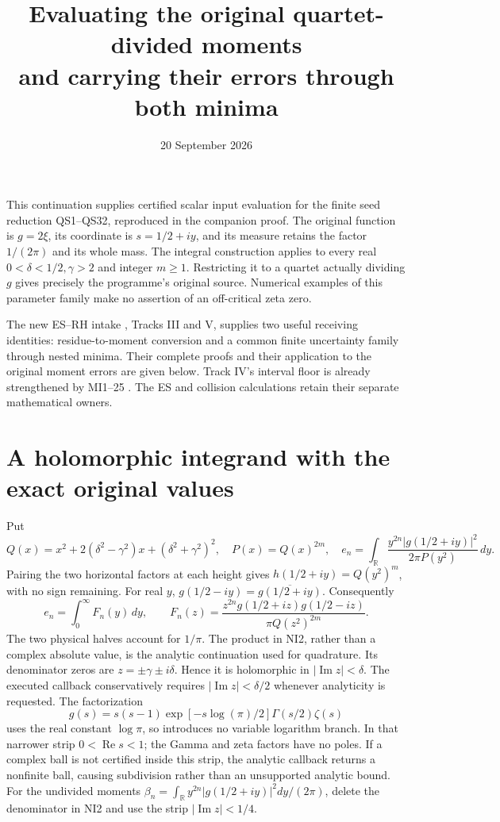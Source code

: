 \documentclass[11pt]{article}
\title{Evaluating the original quartet-divided moments\\and carrying their errors through both minima}
\author{}\date{20 September 2026}
\newcommand{\R}{\mathbb R}\newcommand{\C}{\mathbb C}
\begin{document}
\maketitle
This continuation supplies certified scalar input evaluation for the finite
seed reduction QS1--QS32, reproduced in the companion proof.
The original function is \(g=2\xi\), its coordinate is \(s=1/2+iy\),
and its measure retains the factor \(1/(2\pi)\) and its whole mass.
The integral construction applies to every real
\(0<\delta<1/2,\gamma>2\) and integer \(m\ge1\). Restricting it to a
quartet actually dividing \(g\) gives precisely the programme's
original source. Numerical examples of this parameter family make
no assertion of an off-critical zeta zero.

The new ES--RH intake \cite{Intake}, Tracks III and V, supplies two
useful receiving identities: residue-to-moment conversion and a common
finite uncertainty family through nested minima. Their complete proofs
and their application to the original moment errors are given below.
Track IV's interval floor is already strengthened by MI1--25 \cite{MI}.
The ES and collision calculations retain their separate mathematical owners.

\section{A holomorphic integrand with the exact original values}
Put
\begin{equation}\tag{NI1}
 Q(x)=x^2+2(\delta^2-\gamma^2)x+(\delta^2+\gamma^2)^2,\quad
 P(x)=Q(x)^{2m},\quad
 e_n=\int_\R\frac{y^{2n}|g(1/2+iy)|^2}{2\pi P(y^2)}\,dy.
\end{equation}
Pairing the two horizontal factors at each height gives
\(h(1/2+iy)=Q(y^2)^m\), with no sign remaining.
For real \(y\), \(g(1/2-iy)=\overline{g(1/2+iy)}\).
Consequently
\begin{equation}\tag{NI2}
 e_n=\int_0^\infty F_n(y)\,dy,\qquad
 F_n(z)=\frac{z^{2n}g(1/2+iz)g(1/2-iz)}{\pi Q(z^2)^{2m}}.
\end{equation}
The two physical halves account for \(1/\pi\). The product in NI2,
rather than a complex absolute value, is the analytic continuation
used for quadrature. Its denominator zeros are
\(z=\pm\gamma\pm i\delta\). Hence it is holomorphic in
\(|\operatorname{Im}z|<\delta\). The executed callback conservatively
requires \(|\operatorname{Im}z|<\delta/2\) whenever analyticity is
requested. The factorization
\[
 g(s)=s(s-1)\exp[-s\log(\pi)/2]\Gamma(s/2)\zeta(s)
\]
uses the real constant \(\log\pi\), so introduces no variable
logarithm branch. In that narrower strip \(0<\operatorname{Re}s<1\);
the Gamma and zeta factors have no poles. If a complex ball is not
certified inside this strip, the analytic callback returns a nonfinite
ball, causing subdivision rather than an unsupported analytic bound.
For the undivided moments
\(\beta_n=\int_\R y^{2n}|g(1/2+iy)|^2dy/(2\pi)\),
delete the denominator in NI2 and use the strip
\(|\operatorname{Im}z|<1/4\).
\end{document}

